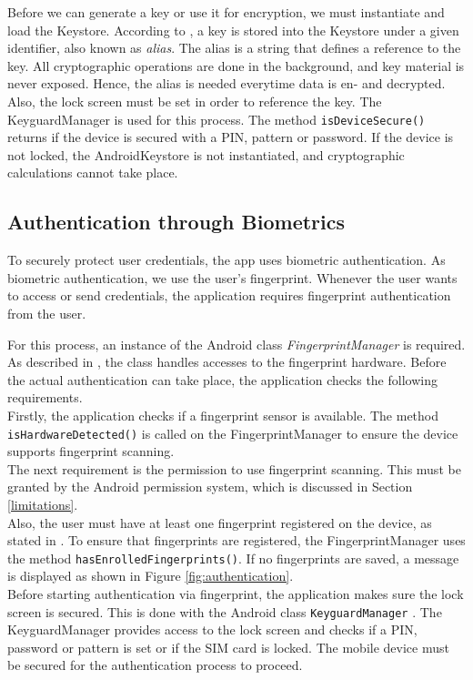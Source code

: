 Before we can generate a key or use it for encryption, we must instantiate and load the Keystore. According to \cite{CooijmansRP14}, a key is stored into the Keystore under a given identifier, also known as \textit{alias}. The alias is a string that defines a reference to the key. All cryptographic operations are done in the background, and key material is never exposed. Hence, the alias is needed everytime data is en- and decrypted. \\
Also, the lock screen must be set in order to reference the key. The KeyguardManager is used for this process. The method \texttt{isDeviceSecure()} returns if the device is secured with a PIN, pattern or password. If the device is not locked, the AndroidKeystore is not instantiated, and cryptographic calculations cannot take place. \\




\subsection{Authentication through Biometrics} \label{arch_authenticate}
To securely protect user credentials, the app uses biometric authentication. As biometric authentication, we use the user's fingerprint. Whenever the user wants to access or send credentials, the application requires fingerprint authentication from the user.

For this process, an instance of the Android class \textit{FingerprintManager} is required. As described in \cite{FingerprintManager}, the class handles accesses to the fingerprint hardware. Before the actual authentication can take place, the application checks the following requirements. \\
Firstly, the application checks if a fingerprint sensor is available. The method \texttt{isHardwareDetected()} is called on the FingerprintManager to ensure the device supports fingerprint scanning. \\
The next requirement is the permission to use fingerprint scanning. This must be granted by the Android permission system, which is discussed in Section \ref{limitations}. \\
Also, the user must have at least one fingerprint registered on the device, as stated in \cite{FingerprintTutorial}. To ensure that fingerprints are registered, the FingerprintManager uses the method \texttt{hasEnrolledFingerprints()}. If no fingerprints are saved, a message is displayed as shown in Figure \ref{fig:authentication}\protect{}. \\
Before starting authentication via fingerprint, the application makes sure the lock screen is secured. This is done with the Android class \texttt{KeyguardManager} \cite{KeyguardManager}. The KeyguardManager provides access to the lock screen and checks if a PIN, password or pattern is set or if the SIM card is locked. The mobile device must be secured for the authentication process to proceed.

